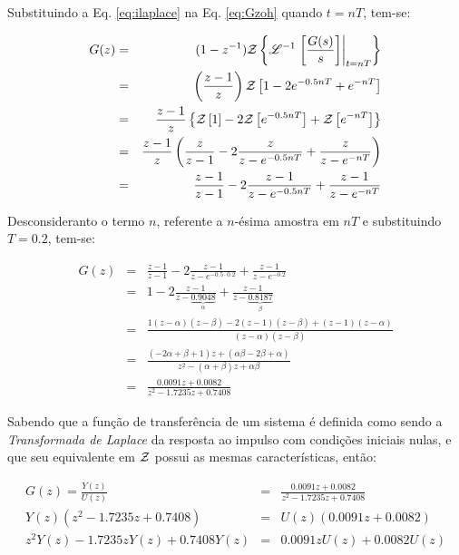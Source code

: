 Substituindo a Eq. \ref{eq:ilaplace} na Eq. \ref{eq:Gzoh} quando $t = nT$,
tem-se:

\begin{eqnarray}
G(z) & = & (1 - z^{-1})
           \mathcal{Z}\left\{\mathscr{L}^{-1}\left.\left[\frac{G(s)}{s}\right]
                                  \right|_{t = nT}\right\}\nonumber\\
& = & \left(\frac{z-1}{z}\right)
      \mathcal{Z}\left[1 - 2e^{-0.5nT} + e^{-nT}\right]\nonumber\\
& = & \frac{z-1}{z}\left\{\mathcal{Z}\left[1\right] - 
                          2\mathcal{Z}\left[e^{-0.5nT}\right] + 
                          \mathcal{Z}\left[e^{-nT}\right]\right\}\nonumber\\
& = & \frac{z-1}{z}\left(\frac{z}{z-1} - 
                           2\frac{z}{z-e^{-0.5nT}} + 
                           \frac{z}{z - e^{-nT}} \right)\nonumber\\
& = & \frac{z-1}{z-1} - 
      2\frac{z-1}{z-e^{-0.5nT}} + 
      \frac{z-1}{z - e^{-nT}}\nonumber\\
\end{eqnarray}

Desconsideranto o termo $n$, referente a $n$-ésima amostra em $nT$ e
substituindo $T = 0.2$, tem-se:

\begin{eqnarray}
G(z) & = & \frac{z-1}{z-1} - 
           2\frac{z-1}{z-e^{-0.5 \cdotp 0.2}} + 
           \frac{z-1}{z-e^{-0.2}}\nonumber\\
& = & 1 - 
      2\frac{z-1}{z-\underbrace{0.9048}_{\alpha}} + 
      \frac{z-1}{z-\underbrace{0.8187}_{\beta}}\nonumber\\
& = & \frac{1(z-\alpha)(z-\beta)-2(z-1)(z-\beta)+(z-1)(z-\alpha)}
           {(z-\alpha)(z-\beta)}\nonumber\\
& = & \frac{(-2\alpha + \beta + 1)z + (\alpha\beta - 2\beta + \alpha)}
           {z^2 - (\alpha+\beta)z + \alpha\beta}\nonumber\\
& = & \frac{0.0091z + 0.0082}{z^2 - 1.7235z + 0.7408}
\end{eqnarray}

Sabendo que a função de transferência de um sistema é definida como sendo a {\it
Transformada de Laplace} da resposta ao impulso com condições iniciais nulas, e
que seu equivalente em $\mathcal{Z}$ possui as mesmas características, então:

\begin{eqnarray}
G(z) = \frac{Y(z)}{U(z)} & = & \frac{0.0091z + 0.0082}
                                    {z^2 - 1.7235z + 0.7408}\nonumber\\
Y(z)(z^2 - 1.7235z + 0.7408) & = & U(z)(0.0091z + 0.0082)\nonumber\\
z^2Y(z) - 1.7235zY(z) + 0.7408Y(z) & = & 0.0091zU(z) +
                                        0.0082U(z)\label{eq:sist_z}
\end{eqnarray}


